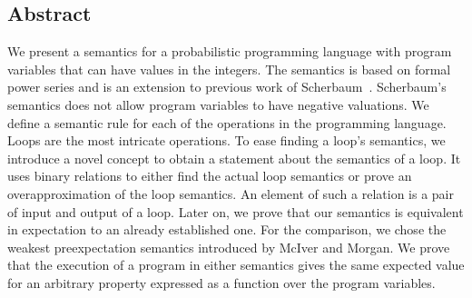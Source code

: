 \begin{center}
\begin{minipage}[t]{0.8\textwidth}
	\section*{Abstract}
We present a semantics for a probabilistic programming language with program variables that can have values in the integers.
The semantics is based on formal power series and is an extension to previous work of Scherbaum~\cite{clara:pgf}.
Scherbaum's semantics does not allow program variables to have negative valuations.
We define a semantic rule for each of the operations in the programming language.
Loops are the most intricate operations.
To ease finding a loop's semantics, we introduce a novel concept to obtain a statement about the semantics of a loop.
It uses binary relations to either find the actual loop semantics or prove an overapproximation of the loop semantics.
An element of such a relation is a pair of input and output of a loop.
Later on, we prove that our semantics is equivalent in expectation to an already established one.
For the comparison, we chose the weakest preexpectation semantics introduced by McIver and Morgan.
We prove that the execution of a program in either semantics gives the same expected value for an arbitrary property expressed as a function over the program variables.
\end{minipage}
\end{center}
